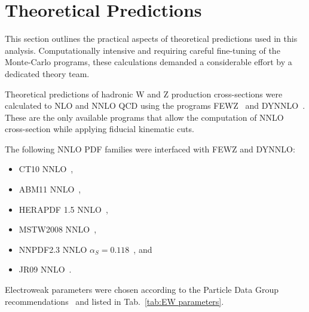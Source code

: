\section{Theoretical Predictions}
\label{sec:theory:nnlo}
This section outlines the practical aspects of theoretical predictions used in this analysis. Computationally intensive and requiring careful fine-tuning of the Monte-Carlo programs, these calculations demanded a considerable effort by a dedicated theory team.

Theoretical predictions of hadronic W and Z production cross-sections were calculated to NLO and NNLO QCD using the programs
FEWZ~\cite{Gavin:2010az, Gavin:2012sy, Li:2012wn} and
DYNNLO~\cite{Catani:2007vq,Catani:2009sm}.
These are the only available programs that allow the computation of
NNLO cross-section while applying fiducial kinematic cuts.

The following NNLO PDF families were interfaced with FEWZ and DYNNLO:
\begin{itemize}
\item CT10 NNLO~\cite{Lai:2010vv},
\item ABM11 NNLO~\cite{Alekhin:2012ig},
\item HERAPDF 1.5 NNLO~\cite{Aaron:2009aa,Radescu:2011cn},
\item MSTW2008 NNLO~\cite{Martin:2009iq},
\item NNPDF2.3 NNLO $\alpha_S = 0.118$~\cite{Ball:2012cx}, and
\item JR09 NNLO~\cite{JimenezDelgado:2008hf}.
\end{itemize}

Electroweak parameters were chosen according to the Particle Data Group recommendations~\cite{PDG} and listed in Tab.~\ref{tab:EW parameters}.

